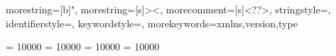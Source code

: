 {
  morestring=[b]",
  morestring=[s]{>}{<},
  morecomment=[s]{<?}{?>},
  stringstyle=\color{black},
  identifierstyle=\color{darkblue},
  keywordstyle=\color{cyan},
  morekeywords={xmlns,version,type}%
}



\setlength{\parskip}{0.5ex plus0.0ex minus0ex} %
\setlength{\itemsep}{0ex minus0.2ex} %
\setlength{\parindent}{0em} %


\hbadness = 10000               %
\clubpenalty = 10000            %
\widowpenalty = 10000       %
\displaywidowpenalty = 10000



\makeatletter
\renewenvironment{thebibliography}[1]
{\subsection*{\refname}%
\@mkboth{\MakeUppercase\refname}{\MakeUppercase\refname}%
\list{\@biblabel{\@arabic\c@enumiv}}%
{\settowidth\labelwidth{\@biblabel{#1}}%
\leftmargin\labelwidth
\setlength{\bibhang}{2em}
\setlength{\bibindent}{3em}
\@openbib@code
\usecounter{enumiv}%
\let\p@enumiv\@empty
\renewcommand\theenumiv{\@arabic\c@enumiv}}%
\clubpenalty4000
\@clubpenalty \clubpenalty
\widowpenalty4000%
\sfcode`\.\@m}
{\def\@noitemerr
{\@latex@warning{Empty `thebibliography' environment}}%
\endlist}
\makeatother


\makeatletter
\renewcommand*\bib@heading{%
  \subsection{\refname}%
}
\makeatother

